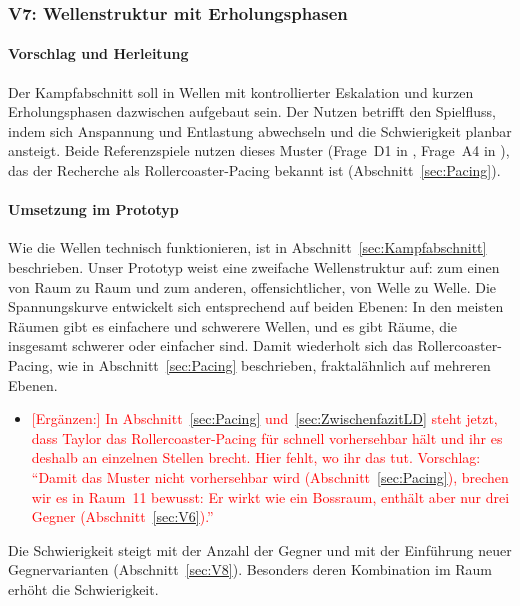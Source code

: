 \documentclass[../Main.tex]{subfiles}
\begin{document}
\subsubsection{V7: Wellenstruktur mit Erholungsphasen} \label{sec:V7}

\paragraph{Vorschlag und Herleitung}
Der Kampfabschnitt soll in Wellen mit kontrollierter Eskalation und kurzen Erholungsphasen dazwischen aufgebaut sein. Der Nutzen betrifft den Spielfluss, indem sich Anspannung und Entlastung abwechseln und die Schwierigkeit planbar ansteigt. Beide Referenzspiele nutzen dieses Muster (Frage~D1 in , Frage~A4 in ), das der Recherche als Rollercoaster-Pacing bekannt ist (Abschnitt~\ref{sec:Pacing}).

\paragraph{Umsetzung im Prototyp}
Wie die Wellen technisch funktionieren, ist in Abschnitt~\ref{sec:Kampfabschnitt} beschrieben. Unser Prototyp weist eine zweifache Wellenstruktur auf: zum einen von Raum zu Raum und zum anderen, offensichtlicher, von Welle zu Welle. Die Spannungskurve entwickelt sich entsprechend auf beiden Ebenen: In den meisten Räumen gibt es einfachere und schwerere Wellen, und es gibt Räume, die insgesamt schwerer oder einfacher sind. Damit wiederholt sich das Rollercoaster-Pacing, wie in Abschnitt~\ref{sec:Pacing} beschrieben, fraktalähnlich auf mehreren Ebenen.

\begin{itemize}[leftmargin=1.5cm]
    \item \textcolor{red}{[Ergänzen:] In Abschnitt~\ref{sec:Pacing} und~\ref{sec:ZwischenfazitLD} steht jetzt, dass Taylor das Rollercoaster-Pacing für schnell vorhersehbar hält und ihr es deshalb an einzelnen Stellen brecht. Hier fehlt, wo ihr das tut. Vorschlag: \enquote{Damit das Muster nicht vorhersehbar wird (Abschnitt~\ref{sec:Pacing}), brechen wir es in Raum~11 bewusst: Er wirkt wie ein Bossraum, enthält aber nur drei Gegner (Abschnitt~\ref{sec:V6}).}}
\end{itemize}

Die Schwierigkeit steigt mit der Anzahl der Gegner und mit der Einführung neuer Gegnervarianten (Abschnitt~\ref{sec:V8}). Besonders deren Kombination im Raum erhöht die Schwierigkeit.
\end{document}

